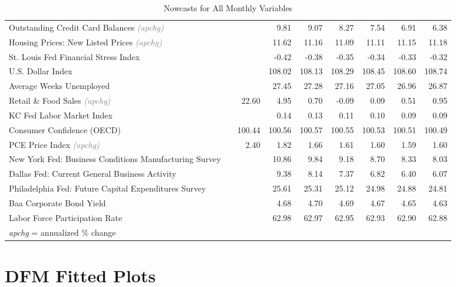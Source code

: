 \documentclass[11pt, letterpaper]{article}\usepackage[]{graphicx}\usepackage[]{color}
\begin{document}
\begin{table}[H]
\begin{tabular}{lrrrrrrrr}
  Outstanding Credit Card Balances \textit{\footnotesize\textcolor{gray}{(apchg)}} &  &  & 9.81 & 9.07 & 8.27 & 7.54 & 6.91 & 6.38 \\ 
  Housing Prices: New Listed Prices \textit{\footnotesize\textcolor{gray}{(apchg)}} &  &  & 11.62 & 11.16 & 11.09 & 11.11 & 11.15 & 11.18 \\ 
  St. Louis Fed Financial Stress Index &  &  & -0.42 & -0.38 & -0.35 & -0.34 & -0.33 & -0.32 \\ 
  U.S. Dollar Index &  &  & 108.02 & 108.13 & 108.29 & 108.45 & 108.60 & 108.74 \\ 
  Average Weeks Unemployed &  &  & 27.45 & 27.28 & 27.16 & 27.05 & 26.96 & 26.87 \\ 
  Retail \& Food Sales \textit{\footnotesize\textcolor{gray}{(apchg)}} &  & 22.60 & 4.95 & 0.70 & -0.09 & 0.09 & 0.51 & 0.95 \\ 
  KC Fed Labor Market Index &  &  & 0.14 & 0.13 & 0.11 & 0.10 & 0.09 & 0.09 \\ 
  Consumer Confidence (OECD) &  & 100.44 & 100.56 & 100.57 & 100.55 & 100.53 & 100.51 & 100.49 \\ 
  PCE Price Index \textit{\footnotesize\textcolor{gray}{(apchg)}} &  & 2.40 & 1.82 & 1.66 & 1.61 & 1.60 & 1.59 & 1.60 \\ 
  New York Fed: Business Conditions Manufacturing Survey &  &  & 10.86 & 9.84 & 9.18 & 8.70 & 8.33 & 8.03 \\ 
  Dallas Fed: Current General Business Activity &  &  & 9.38 & 8.14 & 7.37 & 6.82 & 6.40 & 6.07 \\ 
  Philadelphia Fed: Future Capital Expenditures Survey &  &  & 25.61 & 25.31 & 25.12 & 24.98 & 24.88 & 24.81 \\ 
  Baa Corporate Bond Yield &  &  & 4.68 & 4.70 & 4.69 & 4.67 & 4.65 & 4.63 \\ 
  Labor Force Participation Rate &  &  & 62.98 & 62.97 & 62.95 & 62.93 & 62.90 & 62.88 \\ 
   \hline 
 \textit{apchg} = annualized \% change 
\end{tabular}
\endgroup
\caption{Nowcasts for All Monthly Variables} 
\end{table}



\appendix
\appendixpage
\addappheadtotoc

\section{DFM Fitted Plots}
\end{document}
